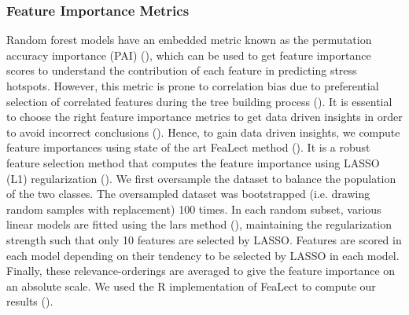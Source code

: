 \documentclass[preprint,1p,times,authoryear]{elsarticle}%
\begin{document}
\subsubsection{Feature Importance Metrics}
Random forest models have an embedded metric known as the permutation accuracy importance (PAI) (\cite{Breiman1996, Breiman2001}), which can be used to get feature importance scores to understand the contribution of each feature in predicting stress hotspots. However, this metric is prone to correlation bias due to preferential selection of correlated features during the tree building process (\cite{Strobl2008}). It is essential to choose the right feature importance metrics to get data driven insights in order to avoid incorrect conclusions (\cite{mangal2018comparative}). Hence, to gain data driven insights, we compute feature importances using state of the art FeaLect method (\cite{Zare2013}). It is a robust feature selection method that computes the feature importance using LASSO (L1) regularization (\cite{Tibshirani1996}). We first oversample the dataset to balance the population of the two classes. The oversampled dataset was bootstrapped (i.e. drawing random samples with replacement) 100 times. In each random subset, various linear models are fitted using the lars method (\cite{Efron2004}), maintaining the regularization strength such that only 10 features are selected by LASSO. Features are scored in each model depending on their tendency to be selected by LASSO in each model. Finally, these relevance-orderings are averaged to give the feature importance on an absolute scale. We used the R implementation of FeaLect to compute our results (\cite{Zare2015}).%

\end{document}
